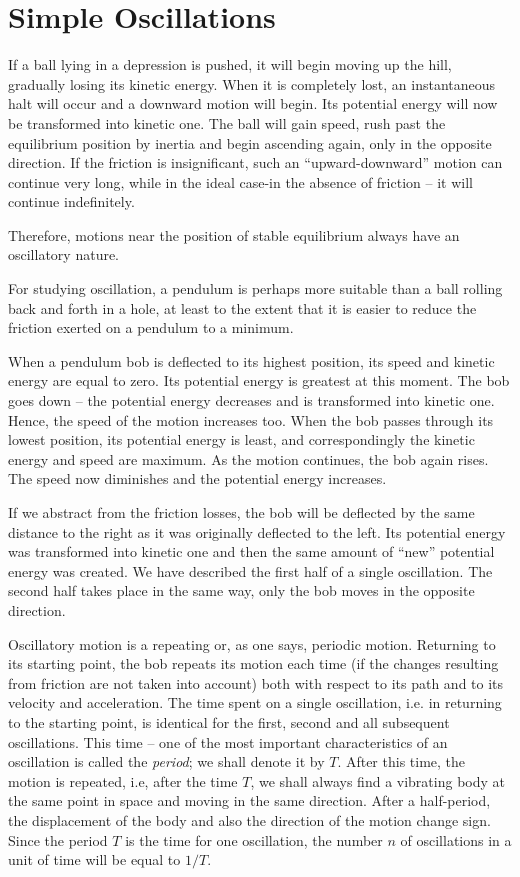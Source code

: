 \section{Simple Oscillations}

If a ball lying in a depression is pushed, it will begin
moving up the hill, gradually losing its kinetic energy.
When it is completely lost, an instantaneous halt will
occur and a downward motion will begin. Its potential
energy will now be transformed into kinetic one. The
ball will gain speed, rush past the equilibrium position
by inertia and begin ascending again, only in the opposite
direction. If the friction is insignificant, such an ``upward-downward'' motion can continue very long, while
in the ideal case-in the absence of friction -- it will continue indefinitely.

Therefore, motions near the position of stable equilibrium always have an oscillatory nature.

For studying oscillation, a pendulum is perhaps more
suitable than a ball rolling back and forth in a hole, at
least to the extent that it is easier to reduce the friction
exerted on a pendulum to a minimum.

When a pendulum bob is deflected to its highest position, its speed and kinetic energy are equal to zero. Its
potential energy is greatest at this moment. The bob goes
down -- the potential energy decreases and is transformed
into kinetic one. Hence, the speed of the motion increases
too. When the bob passes through its lowest position, its
potential energy is least, and correspondingly the kinetic energy and speed are maximum. As the motion continues, the bob again rises. The speed now diminishes and the potential energy increases.

If we abstract from the friction losses, the bob will
be deflected by the same distance to the right as it was
originally deflected to the left. Its potential energy was
transformed into kinetic one and then the same amount of
``new'' potential energy was created. We have described the
first half of a single oscillation. The second half takes
place in the same way, only the bob moves in the opposite
direction.

Oscillatory motion is a repeating or, as one says, periodic motion. Returning to its starting point, the bob repeats its motion each time (if the changes resulting from friction are not taken into account) both with respect to its path and to its velocity and acceleration. The time spent on a single oscillation, i.e. in returning to the starting point, is identical for the first, second and all subsequent oscillations. This time -- one of the most important characteristics of an oscillation is called the \emph{period}; we shall denote it by $T$. After this time, the motion is repeated, i.e, after the time $T$, we shall always find a vibrating body at the same point in space and moving in the same direction. After a half-period, the displacement of the body and also the direction of the motion change sign. Since the period $T$ is the time for one oscillation, the number $n$ of oscillations in a unit of time will be equal to $1/T$.


